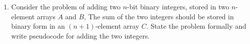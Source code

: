\documentclass[Chapter02]{subfiles}
\begin{document}
\begin{enumerate}[leftmargin=\labelsep]
\begin{answer}
		\end{answer}

		\item Consider the problem of adding two $n$-bit binary integers, stored in two $n$-element arrays $A$ and $B$, The sum of the two integers should be stored in binary form in an $(n + 1)$-element array $C$. State the problem formally and write pseudocode for adding the two integers.
		\begin{answer}
			
		\end{answer}
	\end{enumerate}
\end{document}
